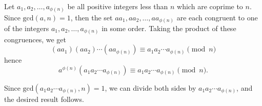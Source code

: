 \documentclass{article}
\begin{document}
Let $a_1, a_2, \ldots , a_{\phi (n)}$ be all positive integers less than $n$ which are coprime to $n$. Since $\text{gcd}(a,n)=1$, then the set $aa_1, aa_2,\ldots ,aa_{\phi (n)}$ are each congruent to one of the integers $a_1, a_2, \ldots ,a_{\phi (n)}$ in some order. Taking the product of these congruences, we get
\[ (aa_1)(aa_2) \cdots (aa_{\phi (n)}) \equiv a_1 a_2 \cdots a_{\phi (n)} \pmod{n} \]
hence
\[ a^{\phi (n)}(a_1 a_2 \cdots a_{\phi (n)}) \equiv a_1 a_2 \cdots a_{\phi (n)} \pmod{n}. \]

Since $\text{gcd}(a_1a_2\cdots a_{\phi (n)},n) = 1$, we can divide both sides by $a_1a_2\cdots a_{\phi (n)}$, and the desired result follows.
\end{document}
